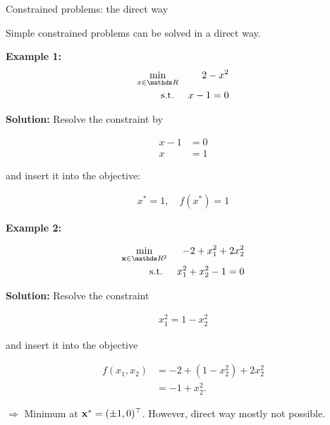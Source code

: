 \documentclass[11pt,compress,t,notes=noshow, xcolor=table]{beamer}
\begin{document}
\begin{vbframe}{Constrained problems: the direct way}

Simple constrained problems can be solved in a direct way.

\medskip

\textbf{Example 1:}
\begin{eqnarray*}
    \min_{x\in \R} && 2 - x^2 \\
    \text{s.t. } && x - 1 = 0
\end{eqnarray*}

\textbf{Solution:} Resolve the constraint by

\vspace{-\baselineskip}

\begin{align*}
    x - 1 &= 0 \\
    x &= 1
\end{align*}

and insert it into the objective: 

\vspace*{-\baselineskip}

\begin{align*}
    x^\ast = 1, \quad f(x^\ast) = 1
\end{align*}

\framebreak

\textbf{Example 2:}

\vspace*{-\baselineskip}

\begin{eqnarray*}
    \min_{\xv \in \R^2} && - 2 + x_1^2 + 2 x_2^2\\
    \text{s.t. } && x_1^2 + x_2^2 - 1 = 0
\end{eqnarray*}

\textbf{Solution:} Resolve the constraint

\vspace{-\baselineskip}

\begin{eqnarray*}
    x_1^2 = 1 - x_2^2
\end{eqnarray*}

and insert it into the objective

\vspace*{-\baselineskip}

\begin{align*}
    f(x_1, x_2) &= -2 + (1 - x_2^2) + 2 x_2^2 \\
    &= -1 + x_2^2.
\end{align*}

$\Rightarrow$ Minimum at $\mathbf{x}^* = (\pm 1, 0)^\top$.
However, direct way mostly not possible.

\end{vbframe}
\end{document}
